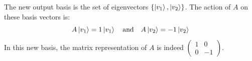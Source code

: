 \documentclass[14pt]{extarticle}
\begin{document}
The new output basis is the set of eigenvectors $\{\ket{v_1}, \ket{v_2}\}$. The action of $A$ on these basis vectors is:
$$ A\ket{v_1} = 1\ket{v_1} \quad \text{and} \quad A\ket{v_2} = -1\ket{v_2} $$
In this new basis, the matrix representation of $A$ is indeed $ \begin{pmatrix} 1 & 0 \\ 0 & -1 \end{pmatrix}$.
\end{document}
